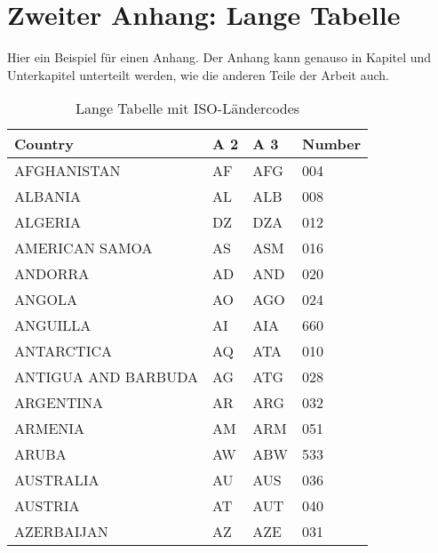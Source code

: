 \chapter{Zweiter Anhang: Lange Tabelle}
\label{AnhangB}

Hier ein Beispiel für einen Anhang. Der Anhang kann genauso in Kapitel und Unterkapitel unterteilt werden, wie die anderen Teile der Arbeit auch.

\sffamily
\begin{footnotesize}
  \begin{longtable}[c]{ p{} p{} p{} p{}}
    \caption[Tabelle mit ISO-Ländercodes]                       %
        {Lange Tabelle mit ISO-Ländercodes\label{laendercodes}} %
        \\
    \toprule
    \textbf{Country} & \textbf{A 2} & \textbf{A 3} & \textbf{Number} \\
    \midrule
    AFGHANISTAN                                    & AF & AFG & 004 \\
    ALBANIA                                        & AL & ALB & 008 \\
    ALGERIA                                        & DZ & DZA & 012 \\
    AMERICAN SAMOA                                 & AS & ASM & 016 \\
    ANDORRA                                        & AD & AND & 020 \\
    ANGOLA                                         & AO & AGO & 024 \\
    ANGUILLA                                       & AI & AIA & 660 \\
    ANTARCTICA                                     & AQ & ATA & 010 \\
    ANTIGUA AND BARBUDA                            & AG & ATG & 028 \\
    ARGENTINA                                      & AR & ARG & 032 \\
    ARMENIA                                        & AM & ARM & 051 \\
    ARUBA                                          & AW & ABW & 533 \\
    AUSTRALIA                                      & AU & AUS & 036 \\
    AUSTRIA                                        & AT & AUT & 040 \\
    AZERBAIJAN                                     & AZ & AZE & 031 \\

\end{longtable}
\end{footnotesize}
